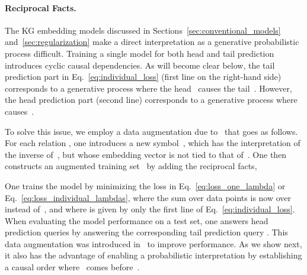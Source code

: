 \documentclass[letterpage]{article}
\begin{document}
\paragraph{Reciprocal Facts.}
The KG embedding models discussed in Sections~\ref{sec:conventional_models} and~\ref{sec:regularization} make a direct interpretation as a generative probabilistic process difficult.
Training a single model for both head and tail prediction introduces cyclic causal dependencies.
As will become clear below, the tail prediction part in Eq.~\ref{eq:individual_loss} (first line on the right-hand side) corresponds to a generative process where the head~ causes the tail~.
However, the head prediction part (second line) corresponds to a generative process where~ causes~.

To solve this issue, we employ a data augmentation due to~\citet{LUO2018} that goes as follows.
For each relation , one introduces a new symbol~, which has the interpretation of the inverse of~, but whose embedding vector is not tied to that of~.
One then constructs an augmented training set~ by adding the reciprocal facts,

One trains the model by minimizing the loss in Eq.~\ref{eq:loss_one_lambda} or Eq.~\ref{eq:loss_individual_lambdas}, where the sum over data points is now over~ instead of~, and where  is given by only the first line of Eq.~\ref{eq:individual_loss}.
When evaluating the model performance on a test set, one answers head prediction queries  by answering the corresponding tail prediction query .
This data augmentation was introduced in~\citep{LUO2018} to improve performance.
As we show next, it also has the advantage of enabling a probabilistic interpretation by establishing a causal order where~ comes before~.
\end{document}
